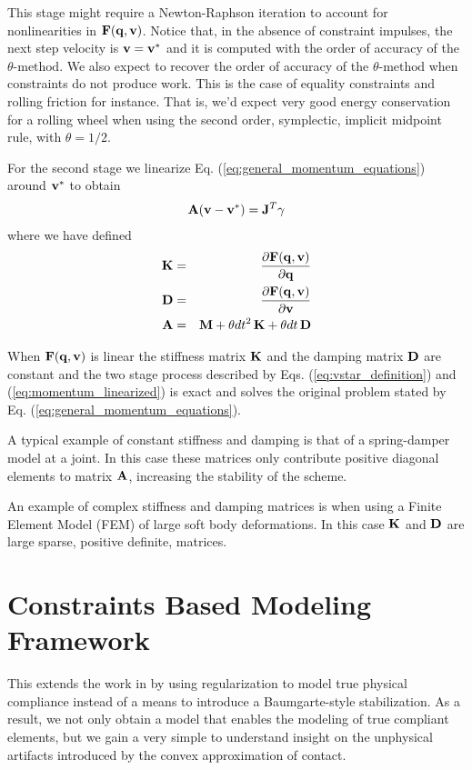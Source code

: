 This stage might require a Newton-Raphson iteration to account for
nonlinearities in ${\mathbf{F}}({\mathbf{q}}, {\mathbf{v}})$. Notice that, in the absence of
constraint impulses, the next step velocity is ${\mathbf{v}}={\mathbf{v}}^*$ and it is
computed with the order of accuracy of the  $\theta\text{-method}$. We also
expect to recover the order of accuracy of the $\theta\text{-method}$ when
constraints do not produce work. This is the case of equality constraints and
rolling friction for instance. That is, we'd expect very good energy
conservation for a rolling wheel when using the second order, symplectic,
implicit midpoint rule, with $\theta=1/2$.

For the second stage we linearize Eq. (\ref{eq:general_momentum_equations})
around ${\mathbf{v}}^*$ to obtain
\begin{eqnarray}
	\mf{A}(\mf{v}-\mf{v}^*)= \mf{J}^T\mf{\gamma}
	\label{eq:momentum_linearized}
\end{eqnarray}
where we have defined
\begin{eqnarray}
	{\mathbf{K}}&=&\frac{\partial {\mathbf{F}}({\mathbf{q}}, {\mathbf{v}})}{\partial {\mathbf{q}}}\\
	{\mathbf{D}}&=&\frac{\partial {\mathbf{F}}({\mathbf{q}}, {\mathbf{v}})}{\partial {\mathbf{v}}}\\
	{\mathbf{A}}&=&{\mathbf{M}}+\theta dt^2\,{\mathbf{K}}+\theta dt\,{\mathbf{D}}
\end{eqnarray}

When ${\mathbf{F}}({\mathbf{q}}, {\mathbf{v}})$ is linear the stiffness matrix ${\mathbf{K}}$ and the
damping matrix ${\mathbf{D}}$ are constant and the two stage process described by Eqs.
(\ref{eq:vstar_definition}) and (\ref{eq:momentum_linearized}) is exact and
solves the original problem stated by Eq. (\ref{eq:general_momentum_equations}).


A typical example of constant stiffness and damping is that of a spring-damper
model at a joint. In this case these matrices only contribute positive diagonal
elements to matrix ${\mathbf{A}}$, increasing the stability of the scheme.

An example of complex stiffness and damping matrices is when using a Finite
Element Model (FEM) of large soft body deformations. In this case ${\mathbf{K}}$ and
${\mathbf{D}}$ are large sparse, positive definite, matrices.

\section{Constraints Based Modeling Framework}
\label{sec:constraints_based_modeling_framework}

This extends the work in \cite{bib:todorov2014} by using regularization to model
true physical compliance instead of a means to introduce a Baumgarte-style
stabilization. As a result, we not only obtain a model that enables the modeling
of true compliant elements, but we gain a very simple to understand insight on
the unphysical artifacts introduced by the convex approximation of contact.

